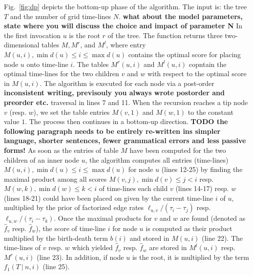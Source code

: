 \documentclass{llncs}
\begin{document}
Fig.~\ref{fig:dp} depicts the bottom-up phase of the algorithm. 
The input is: the tree $T$ and the number of grid time-lines $N$.
{\bf what about the model parameters, state where you will discuss the choice and impact of parameter N}
In the first invocation $u$ is the root $r$ of the tree.  
The function returns three two-dimensional tables $M, M^r$, and
$M^l$, where entry $M(u,i), \min d(u) \leq i \leq \max d(u)$ contains the
optimal score for placing node $u$ onto time-line $i$.
The tables $M^r(u,i)$ and $M^l(u,i)$ copntain the optimal time-lines for 
the two children $v$ and $w$ with respect to the optimal score in $M(u,i)$. 
The algorithm is executed for each node via a post-order {\bf inconsistent writing, previsouly you always wrote postorder and preorder etc.} 
traversal in lines 7 and 11. 
When the recursion reaches a tip node $v$
(resp. $w$), we set the table entries $M(v,1)$ and $M(w,1)$ to the
constant value $1$. The process then continues in a
bottom-up direction. 
{\bf TODO the following paragraph needs to be entirely re-written ins simpler language, shorter sentences, fewer grammatical errors and less passive forms!}
 As soon as the entries of table $M$ have been computed for the
two children of an inner node $u$, the algorithm computes all entries
(time-lines) $M(u,i), \min d(u) \leq i \leq \max d(u)$ for node $u$ (lines
12-25) by finding the maximal product among all scores $M(v,j), \min d(v) \leq j
< i$ resp. $M(w,k), \min d(w) \leq k < i$ of time-lines each child $v$ (lines
14-17) resp. $w$ (lines 18-21) could have been placed on given by the current
time-line $i$ of $u$, multiplied by the prior of factorized edge rates
$\ell_{u,v}/(\tau_i - \tau_j)$ resp. $\ell_{u,w}/(\tau_i - \tau_k)$. Once the
maximal products for $v$ and $w$ are found (denoted as $\hat f_v$ resp. $\hat
f_w$), the score of time-line $i$ for node $u$ is computed as their product
multiplied by the birth-death term $b(i)$ and stored in $M(u,i)$ (line 22).
The time-lines of $v$ resp. $w$ which yielded $\hat f_{v}$ resp. $\hat f_{w}$
are stored in $M^l(u,i)$ resp. $M^r(u,i)$ (line 23). In addition, if node $u$
is the root, it is multiplied by the term $f_1(T\ |\ n,i)$ (line 25).
\end{document}
